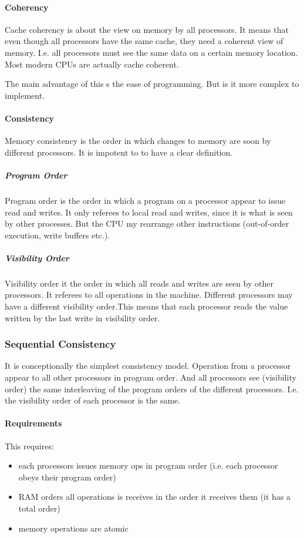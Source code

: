 \paragraph{Coherency}
Cache coherency is about the view on memory by all processors. It means that even though all processors have the same cache, they need a coherent view of memory. I.e. all processors must see the same data on a certain memory location. Most modern CPUs are actually cache coherent. 

The main advantage of this s the ease of programming. But is it more complex to implement.

\paragraph{Consistency}
Memory consistency is the order in which changes to memory are soon by different processors. It is impotent to to have a clear definition.

\subparagraph{Program Order}
Program order is the order in which a program on a processor appear to issue read and writes. It only referees to local read and writes, since it is what is seen by other processes. But the CPU my rearrange other instructions (out-of-order execution, write buffers etc.).

\subparagraph{Visibility Order}
Visibility order it the order in which all reads and writes are seen by other processors. It referees to all operations in the machine. Different processors may have a different visibility order.This means that each processor reads the value written by the last write in visibility order.

\subsubsection{Sequential Consistency}
It is conceptionally the simplest consistency model. Operation from a processor appear to all other processors in program order. And all processors see (visibility order) the same interleaving of the program orders of the different processors. I.e. the visibility order of each processor is the same.

\paragraph{Requirements}
This requires:
\begin{itemize}
    \item each processors issues memory ops in program order (i.e. each processor obeys their program order)
    \item RAM orders all operations is receives in the order it receives them (it has a total order)
    \item memory operations are atomic
\end{itemize}

